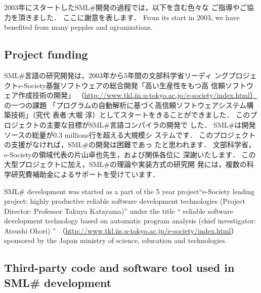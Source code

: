 \documentclass{jbook}
\newcommand{\txt}[2]{#2}
\newcommand{\smlsharp}{SML\#}
\newcommand{\smlsharpSize}{\txt{30万}{0.3 millions}}
\begin{document}
\ifjp%
	2003年にスタートした\smlsharp{}開発の過程では，以下を含む色々な
ご指導やご協力を頂きました．
	ここに謝意を表します．
\else%
	From its start in 2003, we have benefited from many pepples and
ogranizations.
\fi%
	
\subsection{\txt{プロジェクトファンディング}{Project funding}}

\ifjp%
	\smlsharp{}言語の研究開発は，2003年から5年間の文部科学省リーディ
ングプロジェクトe-Society基盤ソフトウェアの総合開発「高い生産性をもつ高
信頼ソフトウェア作成技術の開発」
（\url{http://www.tkl.iis.u-tokyo.ac.jp/e-society/index.html）}
の一つの課題
「プログラムの自動解析に基づく高信頼ソフトウェアシステム構築技術」（究代
表者:大堀 淳）としてスタートをきることができました．
	このプロジェクトの主要な目標が\smlsharp{}言語コンパイラの開発で
した．
	\smlsharp{}は開発ソースの総量が\smlsharpSize{}行を超える大規模シ
ステムです．
	このプロジェクトの支援がなければ，\smlsharp{}の開発は困難であっ
たと思われます．
	文部科学省，e-Societyの領域代表の片山卓也先生，および関係各位に
深謝いたします．
	この大型プロジェクトに加え，\smlsharp{}の理論や実装方式の研究開
発には，複数の科学研究費補助金によるサポートを受けています．

\else%
	\smlsharp{} development was started as a part of the 5 year
project``e-Society leading project: highly productive reliable software
development technologies (Project Director: Professor Takuya Katayama)'' 
under the title
``
reliable software development technology based on automatic program analysis
(chief investigator: Atsushi Ohori)
''
（\url{http://www.tkl.iis.u-tokyo.ac.jp/e-society/index.html}）
sponsored by the Japan ministry of science, education and technologies.

\fi%

\subsection{
\txt{\smlsharp{}が使用しているソフトウエア}
    {Third-party code and software tool used in \smlsharp{} development}
}
\end{document}
